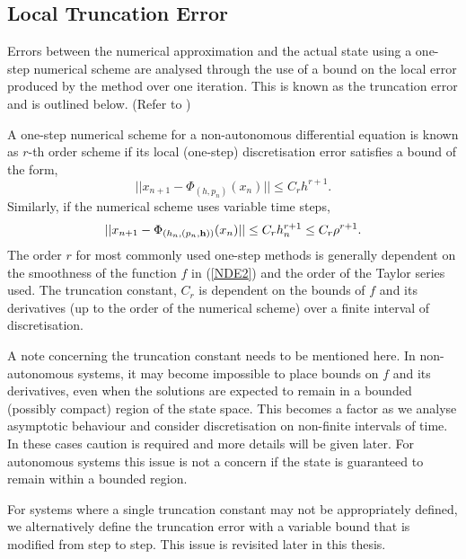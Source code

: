 \subsection{Local Truncation Error}
\label{truncerrorssec}

Errors between the numerical approximation and the actual state
using a one-step numerical scheme are analysed through the use of a
bound on the local error produced by the method over one
iteration. This is known as the truncation error and is outlined
below. (Refer to \cite{JoRi82})

A one-step numerical scheme for a non-autonomous differential equation
is known as $r$-th order scheme if its local (one-step) discretisation
error satisfies a bound of the form,
\begin{equation}\label{trunceq}
  ||x_{n+1} - \Phi_{(h,p_n)}(x_n)|| \leq C_{r}h^{r+1}.
\end{equation}
Similarly, if the numerical scheme uses variable time steps,
\begin{equation}\label{truncvstepeq}
  ||x_{n+1} - \Phi_{(h_n, (p_n, {\bf h}))}(x_n)|| \leq C_{r}h_n^{r+1}
       \leq C_{r}\rho^{r+1}.
\end{equation}
The order $r$ for most commonly used one-step methods is generally
dependent on the smoothness of the function $f$ in
(\ref{NDE2}) and the order of the Taylor series used. The
truncation constant, $C_r$ is dependent on the bounds of $f$
and its derivatives (up to the order of  the numerical scheme)
over a finite interval of discretisation.

A note concerning the truncation constant needs to be mentioned
here. In non-autonomous systems, it may become impossible to place bounds on $f$ and its derivatives, even when the solutions are expected to
remain in a bounded (possibly compact) region of the state space.  This becomes a
factor as we analyse asymptotic behaviour and consider discretisation on
non-finite intervals of time. In these cases caution is required and more details will be given later. For autonomous systems this issue is not a concern
if the state is guaranteed to remain within a bounded region.

For systems where a single truncation constant may not be
appropriately defined, we alternatively define the truncation
error with a variable bound that is modified from step to step.
This issue is revisited later in this thesis.

\endinput
